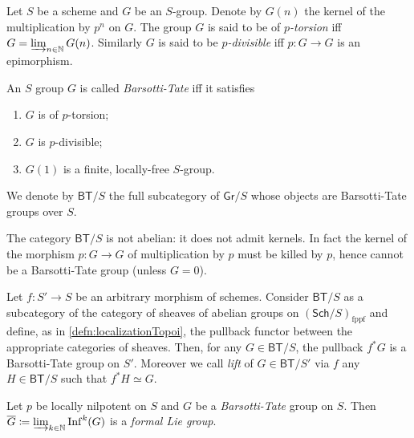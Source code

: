 \begin{defn}
	Let $S$ be a scheme and $G$ be an $S$-group.
	Denote by $G(n)$ the kernel of the multiplication by $p^n$ on $G$.
	The group $G$ is said to be of \emph{$p$-torsion} iff $G = \varinjlim_{n \in \mathbb{N}} G(n)$.
	Similarly $G$ is said to be \emph{$p$-divisible} iff $p\colon G \to G$
	is an epimorphism.
\end{defn}


\begin{defn}\label{BTGroup}
	An $S$ group $G$ is called \emph{Barsotti-Tate} iff it satisfies
\begin{enumerate}
	\item $G$ is of $p$-torsion;
	\item $G$ is $p$-divisible;
	\item $G(1)$ is a finite, locally-free $S$-group.
\end{enumerate}
	We denote by $\mathsf{BT}/S$ the full subcategory of $\mathsf{Gr}/S$
	whose objects are Barsotti-Tate groups over $S$.
\end{defn}


\begin{rem}[]
	The category $\mathsf{BT}/S$ is not abelian:
	it does not admit kernels.
	In fact the kernel of the morphism $p\colon G \to G$
	of multiplication by $p$ must be killed by $p$, hence cannot be
	a Barsotti-Tate group (unless $G=0$).
\end{rem}


\begin{rem}
	Let $f\colon S' \to S$ be an arbitrary morphism of schemes.
	Consider $\mathsf{BT}/S$ as a subcategory of the category of
	sheaves of abelian groups on $\left( \mathsf{Sch}/S  \right)_{\mathrm{fppf}}$
	and define, as in \cref{defn:localizationTopoi}, the pullback
	functor between the appropriate categories of sheaves.
	Then, for any $G \in \mathsf{BT}/S$, the pullback $f^* G$
	is a Barsotti-Tate group on $S'$.
	Moreover we call \emph{lift} of $G \in \mathsf{BT}/S'$ via $f$ any 
	$H \in \mathsf{BT}/S$ such that $f^*H \simeq G$.
\end{rem}


\begin{lem}
	Let $p$ be locally nilpotent on $S$ and $G$ be a \emph{Barsotti-Tate} group on $S$.
	Then
	$\overline{G} \coloneqq \varinjlim_{k \in \mathbb{N}} \mathrm{Inf}^k(G)$
	is a \emph{formal Lie group}.
\end{lem}


